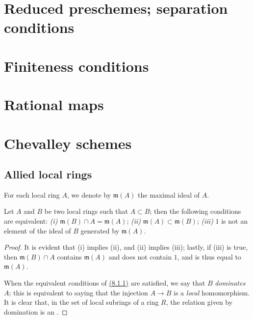 \section{Reduced preschemes; separation conditions}
\label{section-reduced-preschemes-and-separation-conditions}

\section{Finiteness conditions}
\label{section-finiteness-conditions}

\section{Rational maps}
\label{section-rational-maps}

\section{Chevalley schemes}
\label{section-chevalley-schemes}

\subsection{Allied local rings}
\label{subsection-allied-local-rings}

For each local ring $A$, we denote by $\mathfrak{m}(A)$ the maximal ideal of
$A$.

\begin{lem}[8.1.1]
\label{lem-1.8.1.1}
Let $A$ and $B$ be two local rings such that $A\subset B$;
then the following conditions are equivalent: {\it (i)}
$\mathfrak{m}(B)\cap A=\mathfrak{m}(A)$; {\it (ii)}
$\mathfrak{m}(A)\subset\mathfrak{m}(B)$; {\it (iii)} $1$ is not an element of
the ideal of $B$ generated by $\mathfrak{m}(A)$.
\end{lem}

\begin{proof}
\label{proof-lem-1.8.1.1}
It is evident that (i) implies (ii), and (ii) implies (iii); lastly, if (iii) is
true, then $\mathfrak{m}(B)\cap A$ contains $\mathfrak{m}(A)$ and does not
contain $1$, and is thus equal to $\mathfrak{m}(A)$.

When the equivalent conditions of \hyperref[lem-1.8.1.1]{(8.1.1)} are satisfied, we say that $B$
{\it dominates} $A$; this is equivalent to saying that the injection $A\to B$
is a {\it local} homomorphism. It is clear that, in the set of local subrings
of a ring $R$, the relation given by domination is an .
\end{proof}

